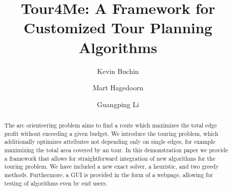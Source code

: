 \documentclass[sigconf,natbib=false]{acmart}
\begin{document}
\title{Tour4Me: A Framework for Customized Tour Planning Algorithms}


\author{Kevin Buchin}

\author{Mart Hagedoorn}

\author{Guangping Li}

\renewcommand{\shortauthors}{Buchin, Hagedoorn, and Li}
\newcommand{\tG}{\textsc{tourGenerator}}

\begin{abstract}
The arc orienteering problem aims to find a route which maximizes the total edge profit without exceeding a given budget.
We introduce the touring problem, which additionally optimizes attributes not depending only on single edges, for example maximizing the total area covered by an tour.
In this demonstration paper we provide a framework that allows for straightforward integration of new algorithms for the touring problem. 
We have included a new exact solver, a heuristic, and two greedy methods.
Furthermore, a GUI is provided in the form of a webpage, allowing for testing of algorithms even by end users.
\end{abstract}
\end{document}
